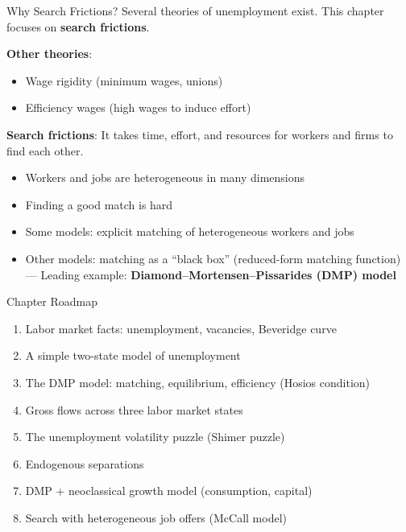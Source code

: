 \documentclass[blue]{beamer}
\begin{document}
\begin{frame}{Why Search Frictions?}
	Several theories of unemployment exist. This chapter focuses on \textbf{search frictions}.
	
	\textbf{Other theories}:
	\vspace{-5pt}
	\begin{itemize}
		\item Wage rigidity (minimum wages, unions)
		\item Efficiency wages (high wages to induce effort)
	\end{itemize}
	
	\textbf{Search frictions}: It takes time, effort, and resources for workers and firms to find each other.
		\vspace{-5pt}
	\begin{itemize}
		\item Workers and jobs are heterogeneous in many dimensions
		\item Finding a good match is hard
		\item Some models: explicit matching of heterogeneous workers and jobs
		\item Other models: matching as a ``black box'' (reduced-form matching function) --- Leading example: \textbf{Diamond--Mortensen--Pissarides (DMP) model}
	\end{itemize}
\end{frame}

\begin{frame}{Chapter Roadmap}
	\begin{enumerate}
		\item Labor market facts: unemployment, vacancies, Beveridge curve
		\item A simple two-state model of unemployment
		\item The DMP model: matching, equilibrium, efficiency (Hosios condition)
		\item Gross flows across three labor market states
		\item The unemployment volatility puzzle (Shimer puzzle)
		\item Endogenous separations
		\item DMP + neoclassical growth model (consumption, capital)
		\item Search with heterogeneous job offers (McCall model)
	\end{enumerate}
\end{frame}

\end{document}
